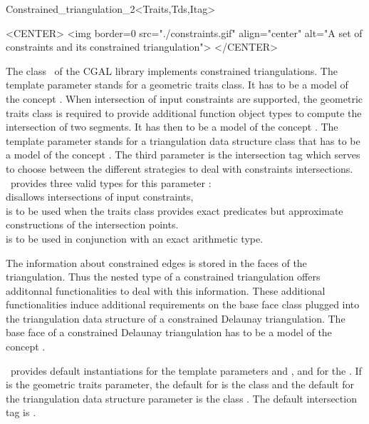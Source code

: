 \begin{ccRefClass}{Constrained_triangulation_2<Traits,Tds,Itag>}
\begin{ccHtmlOnly}
<CENTER>
<img border=0 src="./constraints.gif" align="center" alt="A set of
constraints and its constrained triangulation">
</CENTER>
\end{ccHtmlOnly}

The class \ccRefName\ of the CGAL library
implements constrained triangulations.
The template parameter  
stands for a geometric traits class. It has to be a model
of the concept .
When intersection of input constraints are supported, 
the geometric traits class 
is required to provide additional function object  types
to compute the intersection of two segments.
It has then to be a model of the concept
.
The template parameter 
stands for 
a triangulation data structure class that has to be a model
of the concept .
The third parameter  is the intersection tag
which serves  to choose between the different
strategies to deal with constraints intersections. 
\cgal\ provides three valid types for this parameter : \\
 disallows intersections of
 input constraints,\\
 is to be used when the traits
class
provides exact predicates but approximate constructions of the
intersection points.\\
 is to be used in conjunction
with an exact arithmetic type.

 The information about constrained edges is stored in the 
faces of the triangulation. Thus the nested 
type of a constrained triangulation offers
additonnal functionalities to deal with this information.
These additional functionalities 
induce additional requirements on the base face class
plugged into the triangulation data structure of 
 a constrained Delaunay triangulation.
The base face of a constrained Delaunay triangulation
has to be a model of the concept
.

\cgal\ provides  default instantiations for the template parameters
 and , and for the .
 If  is the geometric traits
parameter,
the default  for
  is the class
and the default for the
triangulation data structure parameter is the class
.
The default intersection tag is .


\end{ccRefClass}
